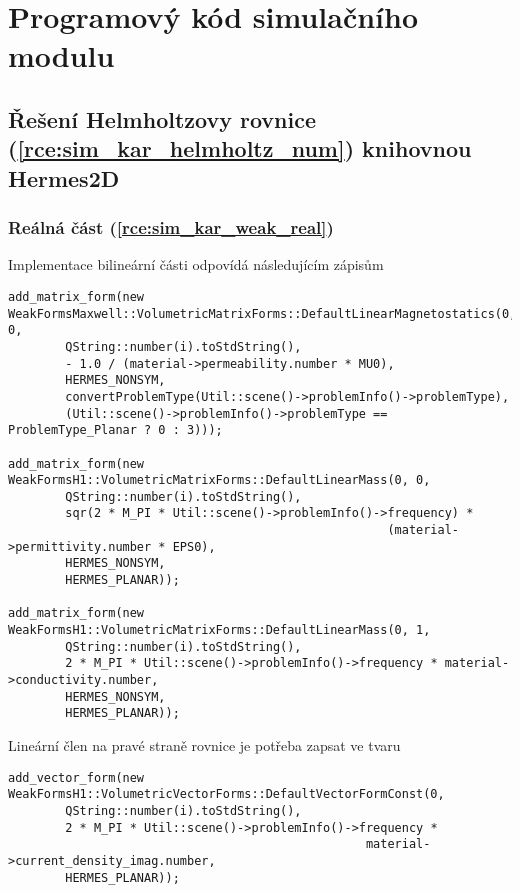 \chapter{Programový kód simulačního modulu} \label{kap:Program_kod}
\section{Řešení Helmholtzovy rovnice (\ref{rce:sim_kar_helmholtz_num}) knihovnou Hermes2D}
\subsection*{Reálná část (\ref{rce:sim_kar_weak_real})}
Implementace bilineární části odpovídá následujícím zápisům
\begin{verbatim}
add_matrix_form(new WeakFormsMaxwell::VolumetricMatrixForms::DefaultLinearMagnetostatics(0, 0,
        QString::number(i).toStdString(),
        - 1.0 / (material->permeability.number * MU0),
        HERMES_NONSYM,
        convertProblemType(Util::scene()->problemInfo()->problemType),
        (Util::scene()->problemInfo()->problemType == ProblemType_Planar ? 0 : 3)));

add_matrix_form(new WeakFormsH1::VolumetricMatrixForms::DefaultLinearMass(0, 0,
        QString::number(i).toStdString(),
        sqr(2 * M_PI * Util::scene()->problemInfo()->frequency) *
                                                     (material->permittivity.number * EPS0),
        HERMES_NONSYM,
        HERMES_PLANAR));
  
add_matrix_form(new WeakFormsH1::VolumetricMatrixForms::DefaultLinearMass(0, 1,
        QString::number(i).toStdString(),
        2 * M_PI * Util::scene()->problemInfo()->frequency * material->conductivity.number,
        HERMES_NONSYM,
        HERMES_PLANAR));
\end{verbatim}
Lineární člen na pravé straně rovnice je potřeba zapsat ve tvaru
\begin{verbatim}
add_vector_form(new WeakFormsH1::VolumetricVectorForms::DefaultVectorFormConst(0,
        QString::number(i).toStdString(),
        2 * M_PI * Util::scene()->problemInfo()->frequency * 
                                                  material->current_density_imag.number,
        HERMES_PLANAR));
\end{verbatim}

